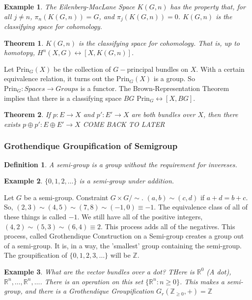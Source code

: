 \documentclass[oneside]{book}
\theoremstyle{mystyle}
\newtheorem{theorem}{Theorem}[section]
\newtheorem{definition}{Definition}[section]
\newtheorem{example}{Example}[section]
\begin{document}
\begin{example}
The Eilenberg-MacLane Space $K(G,n)$ has the property that, for all $j\ne n$, $\pi_{n}(K(G,n)) = G$, and $\pi_{j}(K(G,n)) = 0$. $K(G,n)$ is the classifying space for cohomology.
\end{example}
\begin{theorem}
$K(G,n)$ is the classifying space for cohomology. That is, up to homotopy, $H^{n}(X,G) \leftrightarrow [X,K(G,n)]$.
\end{theorem}
Let $\textrm{Prin}_{G}(X)$ be the collection of $G-$principal bundles on $X$. With a certain equivalence relation, it turns out the $\textrm{Prin}_{G}(X)$ is a group. So $\textrm{Prin}_{G}:\textit{Spaces}\rightarrow \textit{Groups}$ is a functor. The Brown-Representation Theorem implies that there is a classifying space $BG$ $\textrm{Prin}_{G}\leftrightarrow [X,BG]$.
\begin{theorem}
If $p:E\rightarrow X$ and $p':E'\rightarrow X$ are both bundles over $X$, then there exists $p\oplus p':E\oplus E' \rightarrow X$ COME BACK TO LATER
\end{theorem}
\subsubsection{Grothendique Groupification of Semigroup}
\begin{definition}
A semi-group is a group without the requirement for invereses.
\end{definition}
\begin{example}
$\{0,1,2,\hdots\}$ is a semi-group under addition.
\end{example}
Let $G$ be a semi-group. Constraint $G\times G/\sim$. $(a,b) \sim (c,d)$ if $a+d = b+c$. So, $(2,3)\sim (4,5) \sim (7,8)\sim (-1,0) \equiv -1$. The equivalence class of all of these things is called $-1$. We still have all of the positive integers, $(4,2)\sim(5,3) \sim(6,4) \equiv 2$. This process adds all of the negatives. This process, called Grothendique Construction on a Semi-group creates a group out of a semi-group. It is, in a way, the 'smallest' group containing the semi-group. The groupification of $\{0,1,2,3,\hdots\}$ will be $\mathbb{Z}$.
\begin{example}
What are the vector bundles over a dot? THere is $\mathbb{R}^{0}$ (A dot), $\mathbb{R}^{n}, \hdots,\mathbb{R}^n,\hdots $. There is an operation on this set $\{\mathbb{R}^{n}:n \geq 0\}$. This makes a semi-group, and there is a Grothendique Groupification $G_{r}(\mathbb{Z}_{\geq 0}, +) = \mathbb{Z}$
\end{example}
\end{document}
